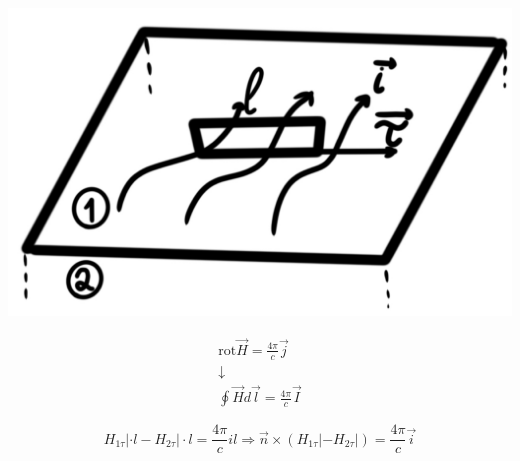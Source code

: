\begin{minipage}[c]{0.4\textwidth} %
    \includegraphics[width=\textwidth]{im/74.png} %
\end{minipage}%
\hfill
\begin{minipage}[c]{0.6\textwidth} %
    \begin{gather*}
        \mathrm{rot}\vec{H}=\frac{4\pi}{c}\vec{j}  \\
        \downarrow \\
        \oint \vec{H}d\vec{l}=\frac{4\pi}{c}\vec{I} 
    \end{gather*}
\end{minipage}

\[
H_{1\tau}|\cdot l -H_{2\tau}|\cdot l=\frac{4\pi}{c}il \Rightarrow \boxed{\vec{n}\times (H_{1\tau}|-H_{2\tau}|)=\frac{4\pi}{c}\vec{i} } 
\]